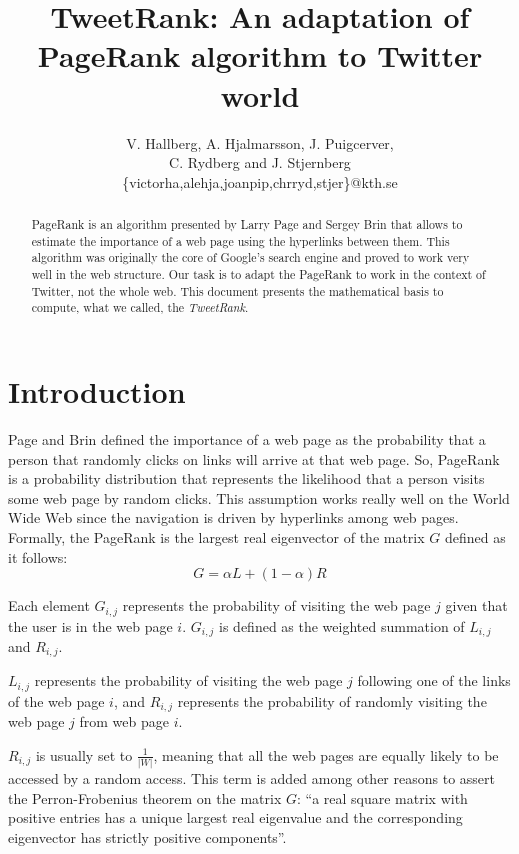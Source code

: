 \documentclass[12pt,a4paper]{article}
\author{V. Hallberg, A. Hjalmarsson, J. Puigcerver, \\C. Rydberg and J. Stjernberg\\
\footnotesize{\{victorha,alehja,joanpip,chrryd,stjer\}@kth.se}}
\title{TweetRank: An adaptation of PageRank algorithm to Twitter world}
\begin{document}
\maketitle
\begin{abstract}
\noindent PageRank is an algorithm presented by Larry Page and Sergey Brin that allows to estimate the importance of a web page using the hyperlinks between them. This algorithm was originally the core of Google's search engine and proved to work very well in the web structure. Our task is to adapt the PageRank to work in the context of Twitter, not the whole web. This document presents the mathematical basis to compute, what we called, the \emph{TweetRank}.
\end{abstract}
\tableofcontents

\newpage

\section{Introduction}
Page and Brin defined the importance of a web page as the probability that a person that randomly clicks on links will arrive at that web page. So, PageRank is a probability distribution that represents the likelihood that a person visits some web page by random clicks. This assumption works really well on the World Wide Web since the navigation is driven by hyperlinks among web pages. \\ 

Formally, the PageRank is the largest real eigenvector of the matrix $G$ defined as it follows:
\begin{equation}\label{eq:basic_pr}
G = \alpha L + (1-\alpha) R
\end{equation}

Each element $G_{i,j}$ represents the probability of visiting the web page $j$ given that the user is in the web page $i$. $G_{i,j}$ is defined as the weighted summation of $L_{i,j}$ and $R_{i,j}$.

$L_{i,j}$ represents the probability of visiting the web page $j$ following one of the links of the web page $i$, and $R_{i,j}$ represents the probability of randomly visiting the web page $j$ from web page $i$. 

$R_{i,j}$ is usually set to $\frac{1}{|W|}$, meaning that all the web pages are equally likely to be accessed by a random access. This term is added among other reasons to assert the Perron-Frobenius theorem on the matrix $G$: ``a real square matrix with positive entries has a unique largest real eigenvalue and the corresponding eigenvector has strictly positive components''. \\
\end{document}
